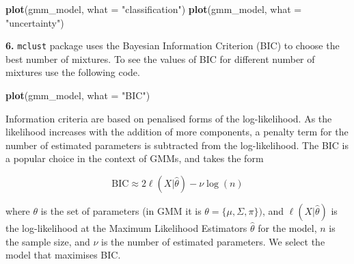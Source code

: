 \documentclass[]{book}
\newenvironment{Shaded}{\begin{snugshade}}{\end{snugshade}}
\newcommand{\KeywordTok}[1]{\textcolor[rgb]{0.13,0.29,0.53}{\textbf{#1}}}
\newcommand{\DataTypeTok}[1]{\textcolor[rgb]{0.13,0.29,0.53}{#1}}
\newcommand{\StringTok}[1]{\textcolor[rgb]{0.31,0.60,0.02}{#1}}
\newcommand{\NormalTok}[1]{#1}
\theoremstyle{definition}
\theoremstyle{definition}
\theoremstyle{definition}
\theoremstyle{remark}
\begin{document}
\begin{Shaded}
\begin{Highlighting}[]
\KeywordTok{plot}\NormalTok{(gmm_model, }\DataTypeTok{what =} \StringTok{"classification"}\NormalTok{)}
\KeywordTok{plot}\NormalTok{(gmm_model, }\DataTypeTok{what =} \StringTok{"uncertainty"}\NormalTok{)}
\end{Highlighting}
\end{Shaded}

\textbf{6.} \texttt{mclust} package uses the Bayesian Information
Criterion (BIC) to choose the best number of mixtures. To see the values
of BIC for different number of mixtures use the following code.

\begin{Shaded}
\begin{Highlighting}[]
\KeywordTok{plot}\NormalTok{(gmm_model, }\DataTypeTok{what =} \StringTok{"BIC"}\NormalTok{)}
\end{Highlighting}
\end{Shaded}

Information criteria are based on penalised forms of the log-likelihood.
As the likelihood increases with the addition of more components, a
penalty term for the number of estimated parameters is subtracted from
the log-likelihood. The BIC is a popular choice in the context of GMMs,
and takes the form

\[ \text{BIC} \approx 2 \ell (X|\hat{\theta}) - \nu \log (n)\]

where \(\theta\) is the set of parameters (in GMM it is
\(\theta=\{\mu,\Sigma,\pi\})\), and \(\ell (X|\hat{\theta})\) is the
log-likelihood at the Maximum Likelihood Estimators \(\hat{\theta}\) for
the model, \(n\) is the sample size, and \(\nu\) is the number of
estimated parameters. We select the model that maximises BIC.
\end{document}
